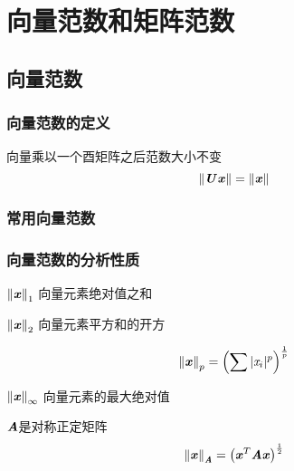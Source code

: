 \chapter{向量范数和矩阵范数}
\label{cha:向量范数和矩阵范数}

\section{向量范数}
\label{sec:向量范数}

\subsection{向量范数的定义}
\label{sub:向量范数的定义}

\begin{definition}[向量范数是酉不变的]
    向量乘以一个酉矩阵之后范数大小不变
    \[
        \left\lVert\boldsymbol{\mathit{U}}\boldsymbol{\mathit{x}}\right\rVert = \left\lVert\boldsymbol{\mathit{x}}\right\rVert
    \]
\end{definition}

\subsection{常用向量范数}
\label{sub:常用向量范数}

\subsection{向量范数的分析性质}
\label{sub:向量范数的分析性质}

\begin{definition}[1-范数或$l_1$范数]
    $\left\lVert\boldsymbol{\mathit{x}}\right\rVert_1$ \quad 向量元素绝对值之和
\end{definition}

\begin{definition}[2-范数或$l_2$范数]
    $\left\lVert\boldsymbol{\mathit{x}}\right\rVert_2$ \quad 向量元素平方和的开方
\end{definition}


\begin{definition}[p-范数或$l_p$范数]
    $$
    \left\lVert\boldsymbol{\mathit{x}}\right\rVert_p = \left( \sum |\mathit{x}_i|^p \right)^{\frac{1}{p}}
    $$
\end{definition}

\begin{definition}
    $\left\lVert\boldsymbol{\mathit{x}}\right\rVert_{\infty}$ 向量元素的最大绝对值
\end{definition}

\begin{definition}
    $\boldsymbol{\mathit{A}}$是对称正定矩阵
    $$
    \left\lVert\boldsymbol{\mathit{x}}\right\rVert_{\boldsymbol{\mathit{A}}} = \left( \boldsymbol{\mathit{x}}^T\boldsymbol{\mathit{A}}\boldsymbol{\mathit{x}} \right)^{\frac{1}{2}}
    $$
\end{definition}

